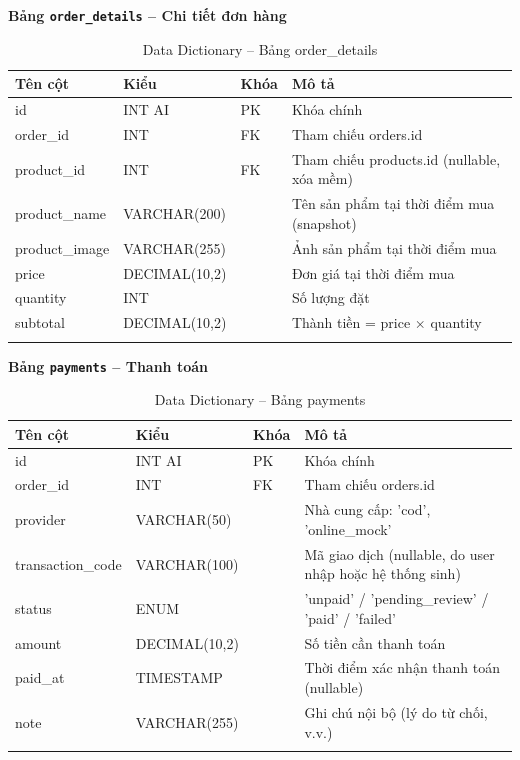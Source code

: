 \documentclass[a4paper]{article}
\begin{document}
\textbf{Bảng \texttt{order\_details} -- Chi tiết đơn hàng}

\begin{longtable}{|p{3.5cm}|p{2.5cm}|p{1.5cm}|p{5cm}|}
\hline
\textbf{Tên cột} & \textbf{Kiểu} & \textbf{Khóa} & \textbf{Mô tả} \\
\hline
\endhead
id & INT AI & PK & Khóa chính \\
\hline
order\_id & INT & FK & Tham chiếu orders.id \\
\hline
product\_id & INT & FK & Tham chiếu products.id (nullable, xóa mềm) \\
\hline
product\_name & VARCHAR(200) & & Tên sản phẩm tại thời điểm mua (snapshot) \\
\hline
product\_image & VARCHAR(255) & & Ảnh sản phẩm tại thời điểm mua \\
\hline
price & DECIMAL(10,2) & & Đơn giá tại thời điểm mua \\
\hline
quantity & INT & & Số lượng đặt \\
\hline
subtotal & DECIMAL(10,2) & & Thành tiền = price $\times$ quantity \\
\hline
\caption{Data Dictionary -- Bảng order\_details}
\end{longtable}

\textbf{Bảng \texttt{payments} -- Thanh toán}

\begin{longtable}{|p{3.5cm}|p{2.5cm}|p{1.5cm}|p{5cm}|}
\hline
\textbf{Tên cột} & \textbf{Kiểu} & \textbf{Khóa} & \textbf{Mô tả} \\
\hline
\endhead
id & INT AI & PK & Khóa chính \\
\hline
order\_id & INT & FK & Tham chiếu orders.id \\
\hline
provider & VARCHAR(50) & & Nhà cung cấp: 'cod', 'online\_mock' \\
\hline
transaction\_code & VARCHAR(100) & & Mã giao dịch (nullable, do user nhập hoặc hệ thống sinh) \\
\hline
status & ENUM & & 'unpaid' / 'pending\_review' / 'paid' / 'failed' \\
\hline
amount & DECIMAL(10,2) & & Số tiền cần thanh toán \\
\hline
paid\_at & TIMESTAMP & & Thời điểm xác nhận thanh toán (nullable) \\
\hline
note & VARCHAR(255) & & Ghi chú nội bộ (lý do từ chối, v.v.) \\
\hline
\caption{Data Dictionary -- Bảng payments}
\end{longtable}
\end{document}
